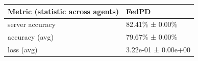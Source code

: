 \begin{tabular}{ll}
\hline
 Metric (statistic across agents)   & FedPD               \\
\hline
 server accuracy                    & 82.41\% ± 0.00\%      \\
 accuracy (avg)                     & 79.67\% ± 0.00\%      \\
 loss (avg)                         & 3.22e-01 ± 0.00e+00 \\
\hline
\end{tabular}